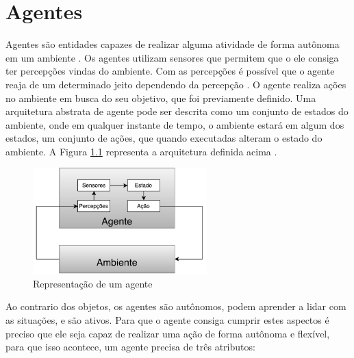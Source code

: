 \chapter{\label{chap:agentes}Agentes}


Agentes são entidades capazes de realizar alguma atividade de forma autônoma em um ambiente \cite{agent1993oriented}. Os agentes utilizam sensores que permitem que o ele consiga ter percepções vindas do ambiente. Com as percepções é possível que o agente reaja de um determinado jeito dependendo da percepção \cite{intelligence2003modern}. O agente realiza ações no ambiente em busca do seu objetivo, que foi previamente definido. Uma arquitetura abstrata de agente pode ser descrita como um conjunto de estados do ambiente, onde em qualquer instante de tempo, o ambiente estará em algum dos estados, um conjunto de ações, que quando executadas alteram o estado do ambiente. A Figura \ref{fig:agente} representa a arquitetura definida acima \cite{agent1999}. 

\begin{figure}[ht]
	\centering
	\includegraphics[width=0.6\textwidth]{fig/agente.pdf}
	\caption{Representação de um agente}
	\label{fig:agente}
\end{figure} 

Ao contrario dos objetos, os agentes são autônomos, podem aprender a lidar com as situações, e são ativos. Para que o agente consiga cumprir estes aspectos é preciso que ele seja capaz de realizar uma ação de forma autônoma e flexível, para que isso acontece, um agente precisa de três atributos\cite{agent1999}: 

